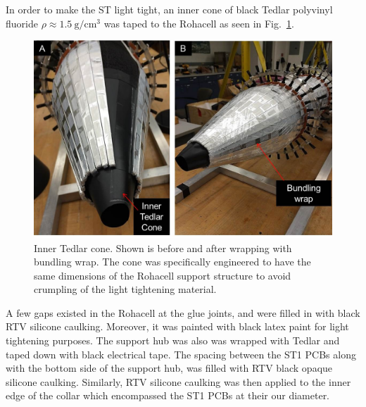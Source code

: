 
In order to make the ST light tight, an inner cone of black Tedlar polyvinyl fluoride $\rho \approx 1.5\ \mathrm{g/cm^{3}}$ \cite{tedlar_pvf} was taped to the Rohacell as seen in Fig.~\ref{fig:light_tightening_cone}. 
\begin{figure}[!htb]
	\centering
	\includegraphics[width=1.0\columnwidth]{fabrication/figs/st_lt_ic_bw}
	\caption{Inner Tedlar cone.  Shown is before and after wrapping with bundling wrap.  The cone was specifically engineered to have the same dimensions of the Rohacell support structure to avoid crumpling of the light tightening material.}
	\label{fig:light_tightening_cone}
\end{figure}
A few gaps existed in the Rohacell at the glue joints, and were filled in with black RTV silicone caulking. Moreover, it was painted with black latex paint for light tightening purposes.  The support hub was also was wrapped with Tedlar and taped down with black electrical tape. The spacing between the ST1 PCBs along with the bottom side of the support hub, was filled with RTV black opaque silicone caulking.  Similarly, RTV silicone caulking was then applied to the inner edge of the collar which encompassed the ST1 PCBs at their our diameter.

